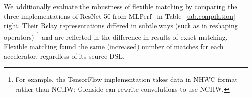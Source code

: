 We additionally
  evaluate the robustness
  of flexible matching
  by comparing
  the three implementations of ResNet-50
  from MLPerf~\cite{reddi2020mlperf}
  in Table~\ref{tab.compilation}, right.
Their Relay representations 
  differed in subtle ways (such as in reshaping operators)%
  \footnote{
For example, the TensorFlow implementation
  takes data in NHWC format rather than NCHW;
  Glenside can rewrite convolutions to use NCHW.}
  and are reflected in the difference in results of exact matching.
Flexible matching found the same (increased) number of matches for each accelerator, regardless of its source DSL.



